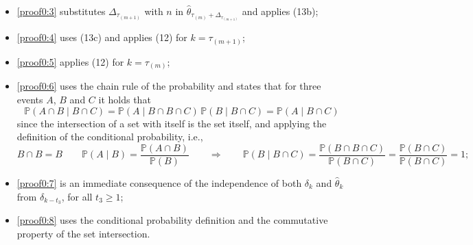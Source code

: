 \documentclass[journal,twoside,web]{ieeecolor}
\begin{document}
\begin{figure*}[ht]
\begin{itemize}
\item \eqref{proof0:3} substitutes $\mathit{\Delta}_{\tau_{(m+1)}}$ with $n$ in $\hat{\theta}_{\tau_{(m)}+\mathit{\Delta}_{\tau_{(m+1)}}}$ and applies (13b);
\item \eqref{proof0:4} uses (13c) and applies (12) for $k=\tau_{(m+1)}$;
\item \eqref{proof0:5} applies (12) for $k=\tau_{(m)}$;
\item \eqref{proof0:6} uses the chain rule of the probability and states that for three events $A$, $B$ and $C$ it holds that 
	\begin{equation}\label{eq:chain-rule-special}
		\mathbb{P}(A \cap B \mid B \cap C ) = \mathbb{P}(A \mid B \cap B \cap C ) \, 
		\mathbb{P}(B \mid B \cap C) = \mathbb{P}(A \mid B \cap C)
	\end{equation}
	since the intersection of a set with itself is the set itself, and applying the definition of the conditional probability, i.e.,
	\begin{equation*}
		B\cap B = B \qquad 
		\mathbb{P}(A\mid B)=\frac{\mathbb{P}(A\cap B)}{\mathbb{P}(B)} \qquad
		\Rightarrow \qquad \mathbb{P}(B\mid B\cap C)=
		\frac{\mathbb{P}(B\cap B\cap C)}{\mathbb{P}(B\cap C)} =
		\frac{\mathbb{P}(B\cap C)}{\mathbb{P}(B\cap C)} = 1;
	\end{equation*}
\item \eqref{proof0:7} is an immediate consequence of the independence of both $\delta_{k}$ and $\hat{\theta}_{k}$ from $\delta_{k-t_{3}}$, for all $t_{3}\geq 1$;
\item \eqref{proof0:8} uses the conditional probability definition and the commutative property of the set intersection.%
\end{itemize}
\end{figure*}
\end{document}
